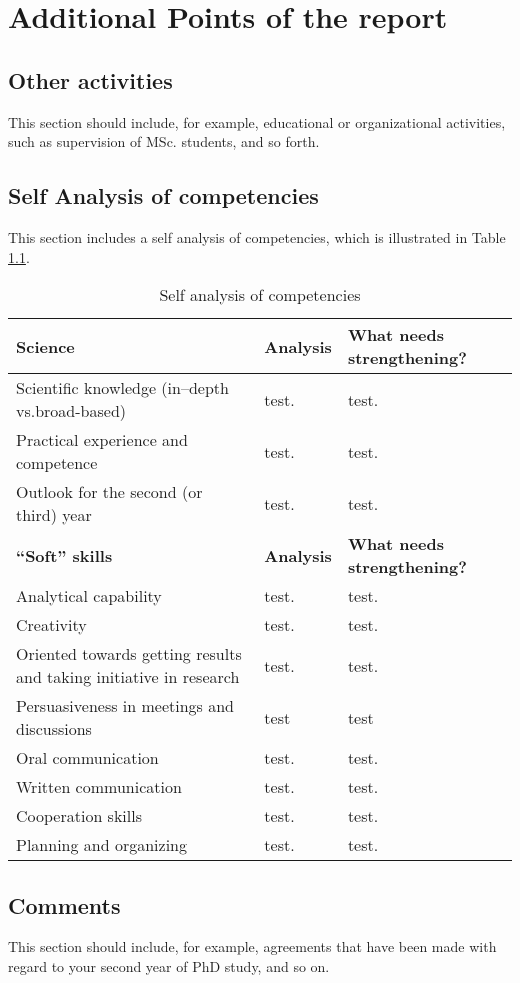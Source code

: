 \chapter{Additional Points of the report} \label{chap:AddOns}

\section{Other activities} \label{sec:otherActivities}
This section should include, for example, educational or organizational activities, such as supervision of MSc. students, and so forth.

\section{Self Analysis of competencies} \label{sec:selfAnalysis}
This section includes a self analysis of competencies, which is illustrated in Table \ref{tab:selfAnalysis}.

\begin{table}[h!]
    \begin{tabular}{|p{30mm} | p{60mm} | p{50mm}|}
        \toprule
\textbf{Science}      
& \textbf{Analysis}   
& \textbf{What needs strengthening?} \\
\midrule
%
Scientific knowledge (in–depth vs.broad-based)
%
& test.        
& test. \\
\hline
%
Practical experience and competence
%       
& test.                        
& test.  \\
\hline
%
Outlook for the second (or third) year
%       
& test.
& test. \\
%
\bottomrule
\toprule
\textbf{“Soft” skills}      
& \textbf{Analysis}   
& \textbf{What needs strengthening?} \\
\midrule
%
Analytical capability
%
& test.        
& test. \\
\hline
%
Creativity
%
& test.        
& test. \\
\hline
%
Oriented towards getting results and taking initiative in research
%
& test.        
& test. \\
\hline
%
Persuasiveness in meetings and discussions
%
& test 
& test \\
\hline
%
Oral communication
%
& test.
& test. \\
\hline
%
Written communication
%
& test. 
& test. \\
\hline
%
Cooperation skills
%
& test. 
& test. \\
%
Planning and organizing
%
& test.
& test. \\
%
\bottomrule
%
\end{tabular}
\caption{Self analysis of competencies} \label{tab:selfAnalysis}
\end{table}

\section{Comments} \label{sec:Comments}
This section should include, for example, agreements that have been made with regard to your second year of PhD study, and so on.